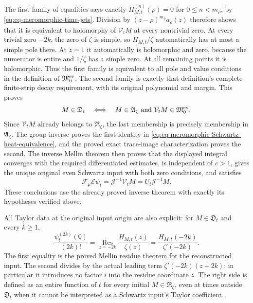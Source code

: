 The first family of equalities says exactly
$H_{M,t}^{(n)}(\rho)=0$ for $0\leq n<m_\rho$, by
\eqref{eq:cq-meromorphic-time-jets}. Division by
$(z-\rho)^{m_\rho}a_\rho(z)$ therefore shows that it is
equivalent to holomorphy of $\mathcal V_tM$ at every nontrivial
zero. At every trivial zero $-2k$, the zero of $\zeta$ is
simple, so $H_{M,t}/\zeta$ automatically has at most a simple
pole there. At $z=1$ it automatically is holomorphic and zero,
because the numerator is entire and $1/\zeta$ has a simple zero.
At all remaining points it is holomorphic. Thus the first family
is equivalent to all pole and value conditions in the definition
of $\mathfrak M_0^{\rm ev}$. The second family is exactly that
definition's complete finite-strip decay requirement, with its
original polynomial and margin. This proves
\[
 M\in\mathfrak D_t
 \quad\Longleftrightarrow\quad
 M\in\mathfrak A_\zeta\text{ and }
            \mathcal V_tM\in\mathfrak M_0^{\rm ev}.
\]
Since $\mathcal V_tM$ already belongs to $\mathfrak R_\zeta$,
the last membership is precisely membership in
$\mathfrak A_\zeta$. The group inverse proves the first
identity in \eqref{eq:cq-meromorphic-Schwartz-heat-equivalence},
and the proved exact trace-image characterization proves the
second. The inverse Mellin theorem then proves that the displayed
integral converges with the required differentiated estimates,
is independent of $c>1$, gives the unique original even Schwartz
input with both zero conditions, and satisfies
\[
 \mathcal F_\mu\mathcal E\psi_t
       =\mathscr J^{-1}\mathcal V_tM
       =U_t\mathscr J^{-1}M.
\]
These conclusions use the already proved inverse theorem with
exactly its hypotheses verified above.

All Taylor data at the original input origin are also explicit:
for $M\in\mathfrak D_t$ and every $k\geq1$,
\begin{equation}\label{eq:cq-meromorphic-heated-Taylor-data}
 \frac{\psi_t^{(2k)}(0)}{(2k)!}
   =\operatorname*{Res}_{z=-2k}\frac{H_{M,t}(z)}{\zeta(z)}
   =\frac{H_{M,t}(-2k)}{\zeta'(-2k)}.
\end{equation}
The first equality is the proved Mellin residue theorem for the
reconstructed input. The second divides by the actual leading
term $\zeta'(-2k)(z+2k)$; in particular it introduces no factor
$i$ into the residue coordinate $z$. The right side is defined
as an entire function of $t$ for every initial
$M\in\mathfrak R_\zeta$, even at times outside
$\mathfrak D_t$ when it cannot be interpreted as a Schwartz
input's Taylor coefficient.

